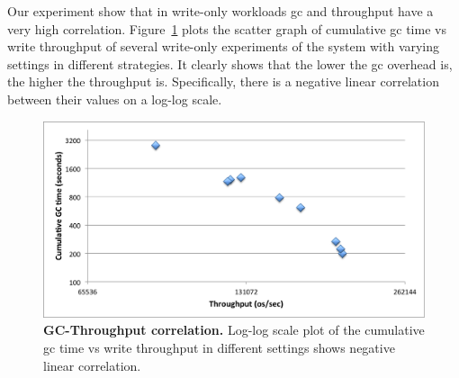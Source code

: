 Our experiment show that in write-only workloads gc and throughput have a very high correlation. 
Figure~\ref{fig:gc-throughput-log2} plots the scatter graph of cumulative gc time vs write throughput of several write-only experiments of the system with varying settings in different strategies. It clearly shows that  the lower the gc overhead is, the higher the throughput is.
Specifically, there is a negative linear correlation between their values on a log-log scale.

\begin{figure}[htb]
\includegraphics[width=\figw]{Figs/gc-throughput-log2.png}
\caption{{\bf GC-Throughput correlation.} Log-log scale plot of the cumulative gc time vs write throughput in different settings shows negative linear correlation.
}
\label{fig:gc-throughput-log2}
\end{figure}
